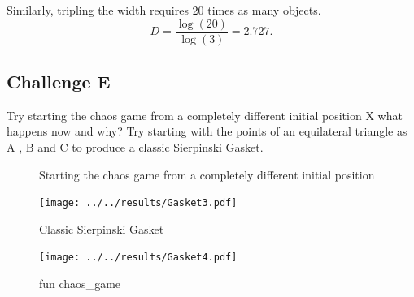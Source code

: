 \documentclass[12pt]{article}
\begin{document}
Similarly, tripling the width requires 20 times as many objects. $$D = \frac{\log(20)}{\log(3)} = 2.727.$$

\newpage
\subsection{Challenge E}
Try starting the chaos game from a completely different initial position X what happens now and why? Try starting with the points of an equilateral triangle as A , B and C to produce a classic Sierpinski Gasket.


\begin{figure}[htbp] 
\centering 
{}%
\centering 
\caption{Starting the chaos game from a completely different initial position}

\begin{minipage}[t]{0.48\textwidth}
\centering
\texttt{[image: ../../results/Gasket3.pdf]}
\caption{Classic Sierpinski Gasket}
\end{minipage}
\begin{minipage}[t]{0.48\textwidth}
\centering
\texttt{[image: ../../results/Gasket4.pdf]}
\caption{fun chaos\_game}
\end{minipage}

\end{figure}
\end{document}
